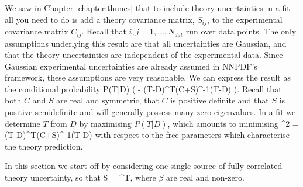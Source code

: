 We saw in Chapter \ref{chapter:thuncs} that to include theory uncertainties in a fit all you need to do is add a theory covariance matrix, $S_{ij}$, to the experimental covariance matrix $C_{ij}$. Recall that $i,j = 1, \dots, N_{dat}$ run over data points. The only assumptions underlying this result are that all uncertainties are Gaussian, and that the theory uncertainties are independent of the experimental data. Since Gaussian experimental uncertainties are already assumed in NNPDF's framework, these assumptions are very reasonable. We can express the result as the conditional probability
\be
\label{eqn:ptd}
P(T|D) \propto \exp \bigg( - (T-D)^T(C+S)^{-1}(T-D) \bigg).
\ee
Recall that both $C$ and $S$ are real and symmetric, that $C$ is positive definite and that $S$ is positive semidefinite and will generally possess many zero eigenvalues. In a fit we determine $T$ from $D$ by maximising $P(T|D)$, which amounts to minimising
\be
\label{eqn:chi2}
\chi^2 =  (T-D)^T(C+S)^{-1}(T-D)
\ee
with respect to the free parameters which characterise the theory prediction.

In this section we start off by considering one single source of fully correlated theory uncertainty, so that
\be 
S = \beta \beta^T,
\ee
where $\beta$ are real and non-zero. 

